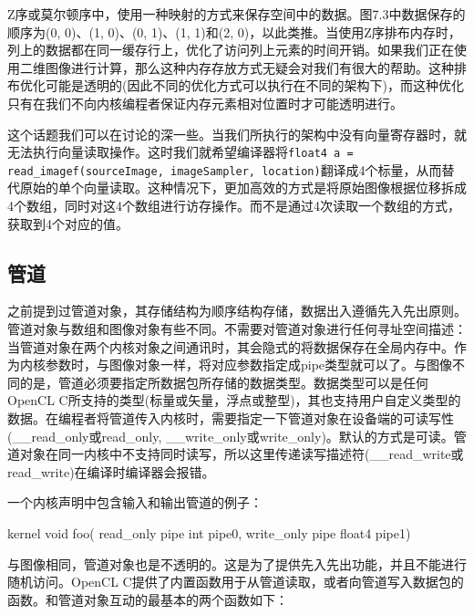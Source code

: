 Z序或莫尔顿序中，使用一种映射的方式来保存空间中的数据。图7.3中数据保存的顺序为(0, 0)、(1, 0)、(0, 1)、(1, 1)和(2, 0)，以此类推。当使用Z序排布内存时，列上的数据都在同一缓存行上，优化了访问列上元素的时间开销。如果我们正在使用二维图像进行计算，那么这种内存存放方式无疑会对我们有很大的帮助。这种排布优化可能是透明的(因此不同的优化方式可以执行在不同的架构下)，而这种优化只有在我们不向内核编程者保证内存元素相对位置时才可能透明进行。


这个话题我们可以在讨论的深一些。当我们所执行的架构中没有向量寄存器时，就无法执行向量读取操作。这时我们就希望编译器将\texttt{float4 a = read\_imagef(sourceImage, imageSampler, location)}翻译成4个标量，从而替代原始的单个向量读取。这种情况下，更加高效的方式是将原始图像根据位移拆成4个数组，同时对这4个数组进行访存操作。而不是通过4次读取一个数组的方式，获取到4个对应的值。

\subsection{管道}

之前提到过管道对象，其存储结构为顺序结构存储，数据出入遵循先入先出原则。管道对象与数组和图像对象有些不同。不需要对管道对象进行任何寻址空间描述：当管道对象在两个内核对象之间通讯时，其会隐式的将数据保存在全局内存中。作为内核参数时，与图像对象一样，将对应参数指定成pipe类型就可以了。与图像不同的是，管道必须要指定所数据包所存储的数据类型。数据类型可以是任何OpenCL C所支持的类型(标量或矢量，浮点或整型)，其也支持用户自定义类型的数据。在编程者将管道传入内核时，需要指定一下管道对象在设备端的可读写性(\_\allowbreak{}\_\allowbreak{}read\_\allowbreak{}only或read\_\allowbreak{}only, \_\allowbreak{}\_\allowbreak{}write\_\allowbreak{}only或write\_\allowbreak{}only)。默认的方式是可读。管道对象在同一内核中不支持同时读写，所以这里传递读写描述符(\_\allowbreak{}\_\allowbreak{}read\_\allowbreak{}write或read\_\allowbreak{}write)在编译时编译器会报错。

一个内核声明中包含输入和输出管道的例子：

\begin{codebox}[cpp]
kernel
void foo(
  read_only pipe int pipe0,
  write_only pipe float4 pipe1)
\end{codebox}

与图像相同，管道对象也是不透明的。这是为了提供先入先出功能，并且不能进行随机访问。OpenCL C提供了内置函数用于从管道读取，或者向管道写入数据包的函数。和管道对象互动的最基本的两个函数如下：

